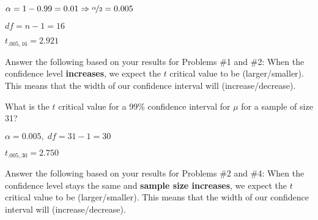 \documentclass[noanswers]{exam}
\begin{document}
\begin{questions}
\begin{solution}[\stretch{1}]
\begin{multicols}{2}
    $\alpha=1-0.99=0.01 \Rightarrow \nicefrac{\alpha}{2}=0.005$
	
	$df=n-1=16$
	
	$t_{.005,16}=2.921$
	
	
	\end{multicols}

	\end{solution}	
	
	\question Answer the following based on your results for Problems \#1 and \#2: When the confidence level \textbf{increases}, we expect the $t$ critical value to be \fillin[larger] (larger/smaller). This means that the width of our confidence interval will \fillin[increase] (increase/decrease).
	
	\vspace{3mm}
	
	\question What is the $t$ critical value for a 99\% confidence interval for $\mu$ for a sample of size 31?
	
	\begin{solution}[\stretch{1}]
	
	\begin{multicols}{2}
	
	
	$\alpha=0.005, \; df=31-1=30$
	
	$t_{.005,30}=2.750$
	
	\end{multicols}
	
	\end{solution}
	
	\question Answer the following based on your results for Problems \#2 and \#4: When the confidence level stays the same and \textbf{sample size increases}, we expect the $t$ critical value to be \fillin[smaller] (larger/smaller). This means that the width of our confidence interval will \fillin[decrease] (increase/decrease).
	

\end{questions}
\end{document}
